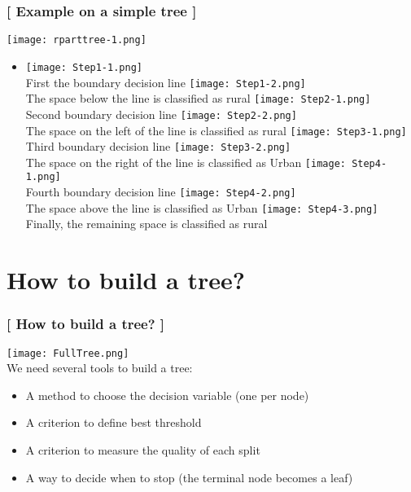 \documentclass[xcolor=x11names,compress, handhouts]{beamer}
\renewcommand{\(}{\begin{columns}}
\renewcommand{\)}{\end{columns}}
\newcommand{\<}[1]{\begin{column}{#1}}
\renewcommand{\>}{\end{column}}
\begin{document}
\begin{frame} %
\frametitle{\textcolor{brique}{[ Example on a simple tree ]}}
\hfill \texttt{[image: rparttree-1.png]} 
\begin{itemize}
\item[]
   {\texttt{[image: Step1-1.png]} \\ }
   {First the boundary decision line}
   { \texttt{[image: Step1-2.png]} \\ }
   {The space below the line is classified as  rural}
   {\texttt{[image: Step2-1.png]} \\ }
   {Second boundary decision line}
   {\texttt{[image: Step2-2.png]} \\ }
   {The space on the left of the line is classified as  rural}
   {\texttt{[image: Step3-1.png]} \\ }
   {Third boundary decision line}
   {\texttt{[image: Step3-2.png]} \\ }
   {The space on the right of the line is classified as  Urban}
   {\texttt{[image: Step4-1.png]} \\ }
   {Fourth boundary decision line}
   {\texttt{[image: Step4-2.png]} \\ }
   {The space above the line is classified as  Urban}
   {\texttt{[image: Step4-3.png]} \\ }
   {Finally, the remaining space is classified as rural}
\end{itemize}
\end{frame}

\section{How to build a tree?}

\begin{frame}
\frametitle{\textcolor{brique}{[ How to build a tree? ]}}
 \hfill \texttt{[image: FullTree.png]} \\

We need several tools to build a tree:
\pause
\begin{itemize}[<+->]
    \item  A method to choose the decision variable (one per node)
    \item  A criterion to define best threshold
    \item  A criterion to measure the quality of each split
    \item  A way to decide when to stop (the terminal node becomes a leaf)
\end{itemize}
\end{frame}
\end{document}
